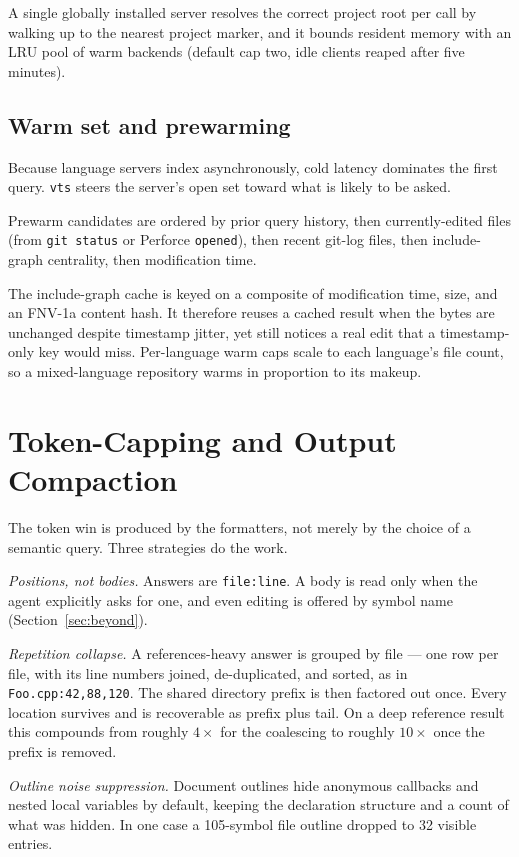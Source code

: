 \documentclass[11pt]{article}
\begin{document}
A single globally installed server resolves the correct project root per call by
walking up to the nearest project marker, and it bounds resident memory with an LRU
pool of warm backends (default cap two, idle clients reaped after five minutes).

\subsection{Warm set and prewarming}
Because language servers index asynchronously, cold latency dominates the first
query. \texttt{vts} steers the server's open set toward what is likely to be asked.

Prewarm candidates are ordered by prior query history, then currently-edited files
(from \texttt{git status} or Perforce \texttt{opened}), then recent git-log files,
then include-graph centrality, then modification time.

The include-graph cache is keyed on a composite of modification time, size, and an
FNV-1a content hash. It therefore reuses a cached result when the bytes are
unchanged despite timestamp jitter, yet still notices a real edit that a
timestamp-only key would miss. Per-language warm caps scale to each language's file
count, so a mixed-language repository warms in proportion to its makeup.

\section{Token-Capping and Output Compaction}
\label{sec:cap}

The token win is produced by the formatters, not merely by the choice of a semantic
query. Three strategies do the work.

\emph{Positions, not bodies.} Answers are \texttt{file:line}. A body is read only
when the agent explicitly asks for one, and even editing is offered by symbol name
(Section~\ref{sec:beyond}).

\emph{Repetition collapse.} A references-heavy answer is grouped by file --- one row
per file, with its line numbers joined, de-duplicated, and sorted, as in
\texttt{Foo.cpp:42,88,120}. The shared directory prefix is then factored out once.
Every location survives and is recoverable as prefix plus tail. On a deep reference
result this compounds from roughly $4\times$ for the coalescing to roughly
$10\times$ once the prefix is removed.

\emph{Outline noise suppression.} Document outlines hide anonymous callbacks and
nested local variables by default, keeping the declaration structure and a count of
what was hidden. In one case a 105-symbol file outline dropped to 32 visible
entries.
\end{document}
